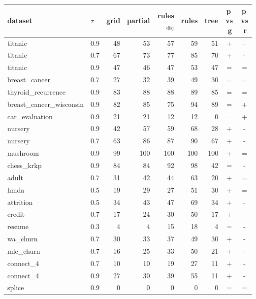 \begin{tabular}{llrrrrrcc}
\toprule
dataset & $\tau$ & grid & partial & rules$_{\mathrm{disj}}$ & rules & tree & p$\,$vs$\,$g & p$\,$vs$\,$r\\
\midrule
titanic & 0.9 & 48 & 53 & 57 & 59 & 51 & + & -\\
titanic & 0.7 & 67 & 73 & 77 & 85 & 70 & + & -\\
titanic & 0.9 & 47 & 46 & 47 & 53 & 47 & = & =\\
breast\_cancer & 0.7 & 27 & 32 & 39 & 49 & 30 & = & =\\
thyroid\_recurrence & 0.9 & 83 & 88 & 88 & 89 & 85 & = & =\\
breast\_cancer\_wisconsin & 0.9 & 82 & 85 & 75 & 94 & 89 & = & +\\
car\_evaluation & 0.9 & 21 & 21 & 12 & 12 & 0 & = & +\\
nursery & 0.9 & 42 & 57 & 59 & 68 & 28 & + & -\\
nursery & 0.7 & 63 & 86 & 87 & 90 & 67 & + & -\\
mushroom & 0.9 & 99 & 100 & 100 & 100 & 100 & + & =\\
chess\_krkp & 0.9 & 84 & 84 & 92 & 98 & 42 & = & -\\
adult & 0.7 & 31 & 42 & 44 & 63 & 20 & + & =\\
hmda & 0.5 & 19 & 29 & 27 & 51 & 30 & + & =\\
attrition & 0.5 & 34 & 43 & 47 & 69 & 34 & + & -\\
credit & 0.7 & 17 & 24 & 30 & 50 & 17 & + & -\\
resume & 0.3 & 4 & 4 & 15 & 18 & 4 & = & -\\
wa\_churn & 0.7 & 30 & 33 & 37 & 49 & 30 & + & -\\
mlc\_churn & 0.7 & 16 & 25 & 33 & 50 & 21 & + & -\\
connect\_4 & 0.7 & 10 & 10 & 19 & 27 & 11 & + & -\\
connect\_4 & 0.9 & 27 & 30 & 39 & 55 & 11 & + & -\\
splice & 0.9 & 0 & 0 & 0 & 0 & 0 & = & =\\
\bottomrule
\end{tabular}
